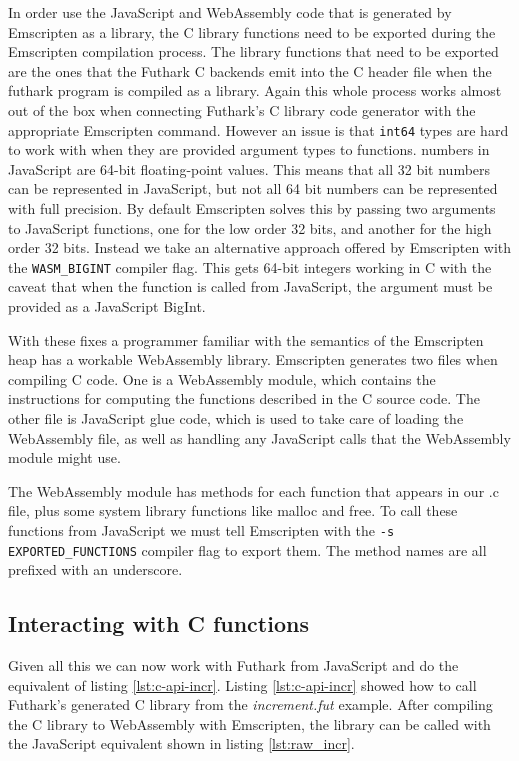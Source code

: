 \documentclass[11pt]{book}
\begin{document}
In order use the JavaScript and WebAssembly code that is generated by Emscripten as a library, the C library functions need to be exported during the Emscripten compilation process. The library functions that need to be exported are the ones that the Futhark C backends emit into the C header file when the futhark program is compiled as a library. Again this whole process works almost out of the box when connecting Futhark's C library code generator with the appropriate Emscripten command. However an issue is that \texttt{int64} types are hard to work with when they are provided argument types to functions. numbers in JavaScript are 64-bit floating-point values. This means that all 32 bit numbers can be represented in JavaScript, but not all 64 bit numbers can be represented with full precision. By default Emscripten solves this by passing two arguments to JavaScript functions, one for the low order 32 bits, and another for the high order 32 bits. Instead we take an alternative approach offered by Emscripten with the \texttt{WASM\_BIGINT} compiler flag. This gets 64-bit integers working in C with the caveat that when the function is called from JavaScript, the argument must be provided as a JavaScript BigInt.

With these fixes a programmer familiar with the semantics of the Emscripten heap has a workable WebAssembly library. Emscripten generates two files when compiling C code. One is a WebAssembly module, which contains the instructions for computing the functions described in the C source code. The other file is JavaScript glue code, which is used to take care of loading the WebAssembly file, as well as handling any JavaScript calls that the WebAssembly module might use.

The WebAssembly module has methods for each function that appears in our .c file, plus some system library functions like malloc and free. To call these functions from JavaScript we must tell Emscripten with the \texttt{-s EXPORTED\_FUNCTIONS} compiler flag to export them. The method names are all prefixed with an underscore.




\subsection{Interacting with C functions}


Given all this we can now work with Futhark from JavaScript and do the equivalent of listing \ref{lst:c-api-incr}. Listing \ref{lst:c-api-incr} showed how to call Futhark's generated C library from the \textit{increment.fut} example. After compiling the C library to WebAssembly with Emscripten, the library can be called with the JavaScript equivalent shown in listing \ref{lst:raw_incr}.
\end{document}
